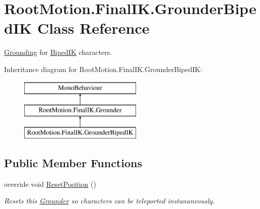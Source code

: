 \hypertarget{class_root_motion_1_1_final_i_k_1_1_grounder_biped_i_k}{}\section{Root\+Motion.\+Final\+I\+K.\+Grounder\+Biped\+IK Class Reference}
\label{class_root_motion_1_1_final_i_k_1_1_grounder_biped_i_k}


\mbox{\hyperlink{class_root_motion_1_1_final_i_k_1_1_grounding}{Grounding}} for \mbox{\hyperlink{class_root_motion_1_1_final_i_k_1_1_biped_i_k}{Biped\+IK}} characters.  


Inheritance diagram for Root\+Motion.\+Final\+I\+K.\+Grounder\+Biped\+IK\+:\begin{figure}[H]
\begin{center}
\leavevmode
\includegraphics[height=3.000000cm]{class_root_motion_1_1_final_i_k_1_1_grounder_biped_i_k}
\end{center}
\end{figure}
\subsection*{Public Member Functions}
\begin{DoxyCompactItemize}
\item 
override void \mbox{\hyperlink{class_root_motion_1_1_final_i_k_1_1_grounder_biped_i_k_ac1056a274304d351106919897e21f57c}{Reset\+Position}} ()
\begin{DoxyCompactList}\small\item\em Resets this \mbox{\hyperlink{class_root_motion_1_1_final_i_k_1_1_grounder}{Grounder}} so characters can be teleported instananeously. \end{DoxyCompactList}\end{DoxyCompactItemize}
